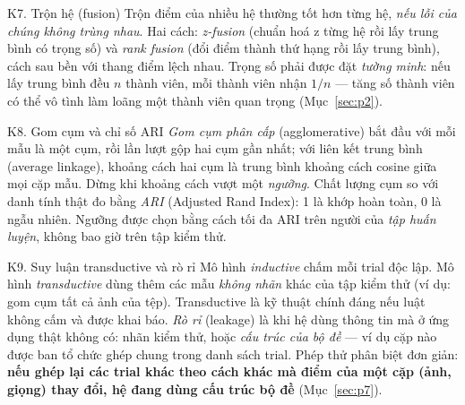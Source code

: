 \documentclass[11pt,a4paper,oneside]{report}
\newcommand{\key}[1]{\textbf{\color{accent}#1}}
\begin{document}
\begin{knowledge}{K7. Trộn hệ (fusion)}
Trộn điểm của nhiều hệ thường tốt hơn từng hệ, \emph{nếu lỗi của chúng không trùng nhau}. Hai cách: \emph{z-fusion} (chuẩn hoá z từng hệ rồi lấy trung bình có trọng số) và \emph{rank fusion} (đổi điểm thành thứ hạng rồi lấy trung bình), cách sau bền với thang điểm lệch nhau. Trọng số phải được đặt \emph{tường minh}: nếu lấy trung bình đều $n$ thành viên, mỗi thành viên nhận $1/n$ --- tăng số thành viên có thể vô tình làm loãng một thành viên quan trọng (Mục~\ref{sec:p2}).
\end{knowledge}

\begin{knowledge}{K8. Gom cụm và chỉ số ARI}
\emph{Gom cụm phân cấp} (agglomerative) bắt đầu với mỗi mẫu là một cụm, rồi lần lượt gộp hai cụm gần nhất; với liên kết trung bình (average linkage), khoảng cách hai cụm là trung bình khoảng cách cosine giữa mọi cặp mẫu. Dừng khi khoảng cách vượt một \emph{ngưỡng}. Chất lượng cụm so với danh tính thật đo bằng \emph{ARI} (Adjusted Rand Index): 1 là khớp hoàn toàn, 0 là ngẫu nhiên. Ngưỡng được chọn bằng cách tối đa ARI trên người của \emph{tập huấn luyện}, không bao giờ trên tập kiểm thử.
\end{knowledge}

\begin{knowledge}{K9. Suy luận transductive và rò rỉ}
Mô hình \emph{inductive} chấm mỗi trial độc lập. Mô hình \emph{transductive} dùng thêm các mẫu \emph{không nhãn} khác của tập kiểm thử (ví dụ: gom cụm tất cả ảnh của tệp). Transductive là kỹ thuật chính đáng nếu luật không cấm và được khai báo. \emph{Rò rỉ} (leakage) là khi hệ dùng thông tin mà ở ứng dụng thật không có: nhãn kiểm thử, hoặc \emph{cấu trúc của bộ đề} --- ví dụ cặp nào được ban tổ chức ghép chung trong danh sách trial. Phép thử phân biệt đơn giản: \key{nếu ghép lại các trial khác theo cách khác mà điểm của một cặp (ảnh, giọng) thay đổi, hệ đang dùng cấu trúc bộ đề} (Mục~\ref{sec:p7}).
\end{knowledge}
\end{document}
